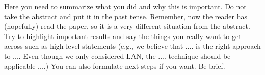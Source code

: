 Here you need to summarize what you did and why this is
important. Do not take the abstract and put it in the past
tense. Remember, now the reader has (hopefully) read the
paper, so it is a very different situation from the abstract.
Try to highlight important results and say the things you really
want to get across such as high-level statements (e.g.,
we believe that .... is the right approach to .... Even though
we only considered LAN, the .... technique should be applicable
....) You can also formulate next steps if you want.
Be brief.